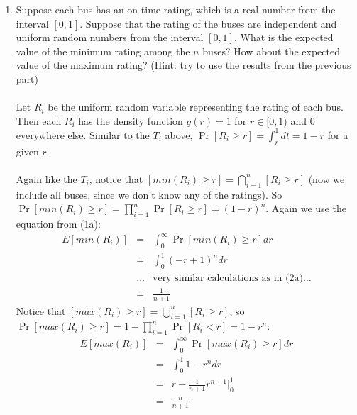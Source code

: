 \documentclass[11pt,fleqn]{article}
\begin{document}
\begin{enumerate}
\begin{enumerate}
\newpage
\item Suppose each bus has an on-time rating, which is a real number from the interval $[0,1]$. Suppose that the rating of the buses are independent and uniform random numbers from the interval $[0,1]$. What is the expected value of the minimum rating among the $n$ buses? How about the expected value of the maximum rating? (Hint: try to use the results from the previous part) \\\\
Let $R_i$ be the uniform random variable representing the rating of each bus. Then each $R_i$ has the density function $g(r) = 1$ for $r \in [0,1)$ and $0$ everywhere else. Similar to the $T_i$ above, $\Pr[R_i \geq r] = \int_r^1 dt = 1-r$ for a given $r$. \\\\
Again like the $T_i$, notice that $[min(R_i) \geq r] = \bigcap_{i=1}^n [R_i \geq r]$ (now we include all buses, since we don't know any of the ratings). So $\Pr[min(R_i)\geq r] = \prod_{i=1}^n \Pr[R_i \geq r] = (1-r)^n$. Again we use the equation from (1a):
\begin{eqnarray*}
E[min(R_i)] &=& \int_{0}^{\infty} \Pr[min(R_i)\geq r]dr \\
&=& \int_0^1 (-r+1)^ndr \\
&\ldots& \text{very similar calculations as in (2a)} \ldots \\
&=& \frac1{n+1}
\end{eqnarray*}
Notice that $[max(R_i) \geq r] = \bigcup_{i=1}^n [R_i \geq r]$, so $\Pr[max(R_i) \geq r] = 1-\prod_{i=1}^n \Pr[R_i < r] = 1-r^n$:
\begin{eqnarray*}
E[max(R_i)] &=& \int_{0}^{\infty} \Pr[max(R_i)\geq r]dr \\
&=& \int_0^1 1-r^ndr \\
&=& r-\frac1{n+1}r^{n+1} \bigg|_0^1 \\
&=& \frac{n}{n+1}
\end{eqnarray*}
\end{enumerate}


\end{enumerate}
\end{document}
